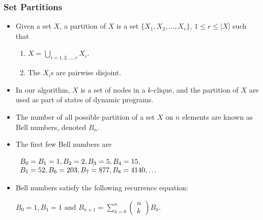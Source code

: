 \documentclass{beamer}
\begin{document}
\begin{frame}
\frametitle{Set Partitions}
\begin{itemize}
 \item Given a set $X$, a partition of $X$ is a set $\{X_1,X_2,\ldots, X_r\}$, $1\leq r\leq |X|$ such that 
\begin{enumerate}
\item $X=\displaystyle \bigcup_{i=1,2,\ldots,r} X_i$.
\item The $X_i$s are pairwise disjoint.
\end{enumerate}
\item In our algorithm, $X$ is a set of nodes in a $k$-clique, and the partition of $X$ are used as part of states of dynamic programs.
\item The number of all possible partition of a set $X$ on $n$ elements are known as Bell numbers, denoted $B_n$.
\item The first few Bell numbers are 
\begin{center}
$\begin{array}[t]{l}
B_0=B_1=1,B_2=2,B_3=5,B_4=15,\\
B_5=52,B_6=203,B_7=877,B_8=4140, \ldots \\
\end{array}$
\end{center}
\item Bell numbers satisfy the following recurrence equation:
\begin{center}
$ B_0=1, B_1=1 \mbox{ and } B_{n+1}=\displaystyle \sum_{k=0}^n (\begin{array}{l} n \\ k \end{array})B_k.
$
\end{center}
\end{itemize}
\end{frame}
\end{document}
